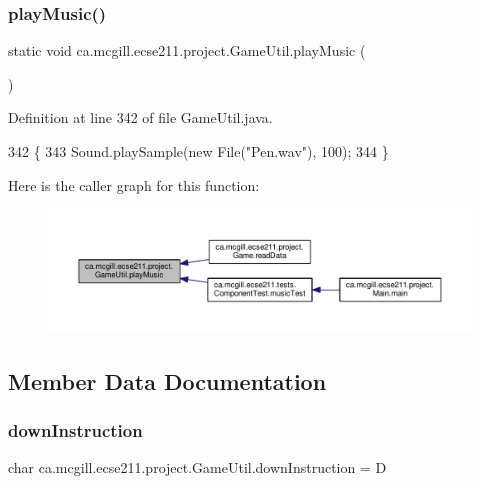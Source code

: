 \subsubsection{\texorpdfstring{play\+Music()}{playMusic()}}
{\footnotesize\ttfamily static void ca.\+mcgill.\+ecse211.\+project.\+Game\+Util.\+play\+Music (\begin{DoxyParamCaption}{ }\end{DoxyParamCaption})\hspace{0.3cm}{\ttfamily [static]}}



Definition at line 342 of file Game\+Util.\+java.


\begin{DoxyCode}
342                                  \{
343     Sound.playSample(\textcolor{keyword}{new} File(\textcolor{stringliteral}{"Pen.wav"}), 100);
344   \}
\end{DoxyCode}
Here is the caller graph for this function\+:\nopagebreak
\begin{figure}[H]
\begin{center}
\leavevmode
\includegraphics[width=350pt]{classca_1_1mcgill_1_1ecse211_1_1project_1_1_game_util_a38f0e4fdf048d1c265a4b5fc712588f3_icgraph}
\end{center}
\end{figure}


\subsection{Member Data Documentation}
\mbox{\label{classca_1_1mcgill_1_1ecse211_1_1project_1_1_game_util_afc9ecf0a8a18c0abea79086801d8425a}} 
\subsubsection{\texorpdfstring{down\+Instruction}{downInstruction}}
{\footnotesize\ttfamily char ca.\+mcgill.\+ecse211.\+project.\+Game\+Util.\+down\+Instruction = \textquotesingle{}D\textquotesingle{}\hspace{0.3cm}{\ttfamily [static]}}



